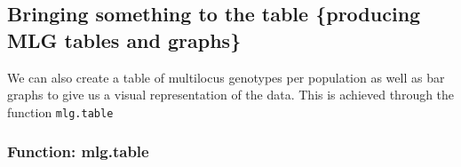 \documentclass[letterpaper]{article}\usepackage[]{graphicx}\usepackage[]{color}
\begin{document}
%
\subsection{Bringing something to the table \{producing MLG tables and graphs\}}
\label{mlg:table}

We can also create a table of multilocus genotypes per population as well as bar graphs to give us a visual representation of the data. This is achieved through the function \texttt{mlg.table}
\subsubsection{Function: mlg.table}
\label{mlg:table:mlg.table}
\end{document}
